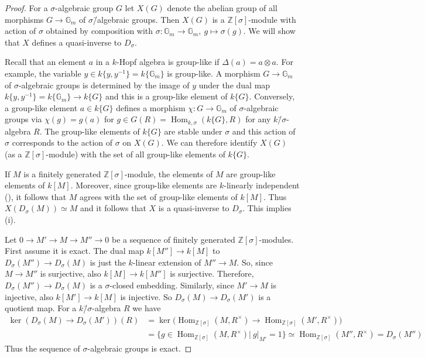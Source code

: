 \documentclass[oneside,reqno]{amsart}
\theoremstyle{definition}
\newcommand{\Hom}{\operatorname{Hom}}
\newcommand{\s}{\sigma}
\newcommand{\ks}{$k$\=/$\s$}
\newcommand{\Gm}{\mathbb{G}_m}
\newcommand{\ZZ}{\mathbb{Z}}
\begin{document}
\begin{proof}
	For a $\s$-algebraic group $G$ let $X(G)$ denote the abelian group of all morphisms $G\to \Gm$ of $\s$\=/algebraic groups. Then $X(G)$ is a $\ZZ[\s]$-module with action of $\s$ obtained by composition with $\s\colon \Gm\to \Gm,\ g\mapsto \s(g)$. We will show that $X$ defines a quasi-inverse to $D_\s$.
	
	Recall that an element $a$ in a $k$-Hopf algebra is group-like if $\Delta(a)=a\otimes a$. For example, the variable $y\in k\{y,y^{-1}\}=k\{\Gm\}$ is group-like. A morphism $G\to \Gm$ of $\s$-algebraic groups is determined by the image of $y$ under the dual map $k\{y,y^{-1}\}=k\{\Gm\}\to k\{G\}$ and this is a group-like element of $k\{G\}$. Conversely, a group-like element $a\in k\{G\}$ defines a morphism $\chi\colon G\to \Gm$ of $\s$-algebraic groups via $\chi(g)=g(a)$ for $g\in G(R)=\Hom_{k,\s}(k\{G\},R)$ for any \ks-algebra $R$. The group-like elements of $k\{G\}$ are stable under $\s$ and this action of $\s$ corresponds to the action of $\s$ on $X(G)$. We can therefore identify $X(G)$ (as a $\ZZ[\s]$-module) with the set of all group-like elements of $k\{G\}$. 
	
	If $M$ is a finitely generated $\ZZ[\s]$-module, the elements of $M$ are group-like elements of $k[M]$. Moreover, since group-like elements are $k$-linearly independent (\cite[Lemma 2.2]{Waterhouse:IntroductiontoAffineGroupSchemes}), it follows that $M$ agrees with the set of group-like elements of $k[M]$.
	Thus $X(D_\s(M))\simeq M$ and it follows that $X$ is a quasi-inverse to $D_\s$. This implies (i).
	
	Let $0\to M'\to M\to M''\to 0$ be a sequence of finitely generated $\ZZ[\s]$-modules. First assume it is exact. 
	The dual map $k[M'']\to k[M]$ to $D_\s(M'')\to D_\s(M)$ is just the $k$-linear extension of $M''\to M$. So, since $M\to M''$ is surjective, also $k[M]\to k[M'']$ is surjective. Therefore, $D_\s(M'')\to D_\s(M)$ is a $\s$-closed embedding. Similarly, since $M'\to M$ is injective, also $k[M']\to k[M]$ is injective. So $D_\s(M)\to D_\s(M')$ is a quotient map. For a \ks-algebra $R$ we have
	\begin{align*}
		\ker(D_\s(M)\to D_\s(M'))(R)& =\ker\big(\Hom_{\ZZ[\s]}(M,R^\times)\to\Hom_{\ZZ[\s]}(M',R^\times)\big) \\
		&=\{g\in \Hom_{\ZZ[\s]}(M,R^\times)|\ g|_{M'}=1\}\simeq \Hom_{\ZZ[\s]}(M'',R^\times)=D_\s(M'')
	\end{align*}
	Thus the sequence of $\s$-algebraic groups is exact.
	

\end{proof}
\end{document}
